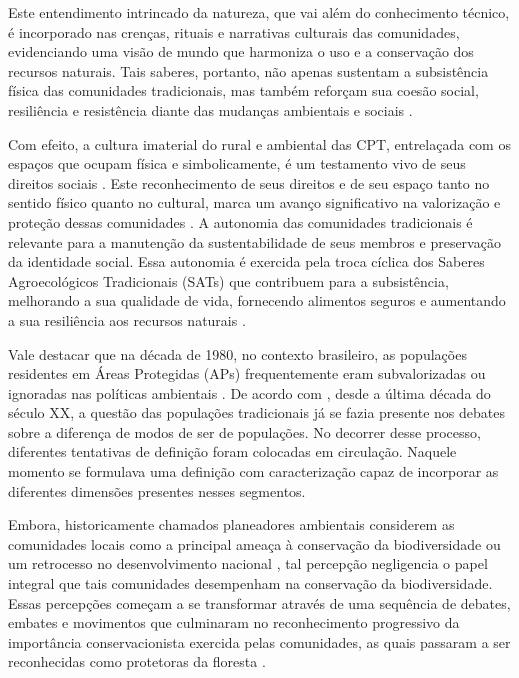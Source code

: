 Este entendimento intrincado da natureza, que vai além do conhecimento técnico, é incorporado nas crenças, rituais e narrativas culturais das comunidades, evidenciando uma visão de mundo que harmoniza o uso e a conservação dos recursos naturais. Tais saberes, portanto, não apenas sustentam a subsistência física das comunidades tradicionais, mas também reforçam sua coesão social, resiliência e resistência diante das mudanças ambientais e sociais \cite{Brzi2023}.

Com efeito, a cultura imaterial do rural e ambiental das CPT, entrelaçada com os espaços que ocupam física e simbolicamente, é um testamento vivo de seus direitos sociais \cite{BobatoStadler2020}. Este reconhecimento de seus direitos e de seu espaço tanto no sentido físico quanto no cultural, marca um avanço significativo na valorização e proteção dessas comunidades \cite{Colao2011}.
A autonomia das comunidades tradicionais é relevante para a manutenção da sustentabilidade de seus membros e preservação da identidade social. Essa autonomia é exercida pela troca cíclica dos Saberes Agroecológicos Tradicionais (SATs) que contribuem para a subsistência, melhorando a sua qualidade de vida, fornecendo alimentos seguros e aumentando a sua resiliência aos recursos naturais \cite{MohdSalim2023}. 

Vale destacar que na década de 1980, no contexto brasileiro, as populações residentes em Áreas Protegidas (APs) frequentemente eram subvalorizadas ou ignoradas nas políticas ambientais \cite{Marques2016}. De acordo com , desde a última década do século XX, a questão das populações tradicionais já se fazia presente nos debates sobre a diferença de modos de ser de populações. No decorrer desse processo, diferentes tentativas de definição foram colocadas em circulação. Naquele momento se formulava uma definição com caracterização capaz de incorporar as diferentes dimensões presentes nesses segmentos.

Embora, historicamente chamados planeadores ambientais considerem as comunidades locais como a principal ameaça à conservação da biodiversidade ou um retrocesso no desenvolvimento nacional \cite{Singh2000}, tal percepção negligencia o papel integral que tais comunidades desempenham na conservação da biodiversidade. Essas percepções começam a se transformar através de uma sequência de debates, embates e movimentos que culminaram no reconhecimento progressivo da importância conservacionista exercida pelas comunidades, as quais passaram a ser reconhecidas como protetoras da floresta \cite{Asante2017}.


